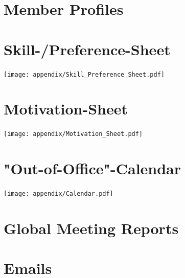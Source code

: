 \section{Member Profiles} 
\label{sec:member_profiles}








\section{Skill-/Preference-Sheet} \label{sec:Skill_Preference_Sheet}
\texttt{[image: appendix/Skill\_Preference\_Sheet.pdf]}

\section{Motivation-Sheet} 
\label{sec:Motivation_Sheet}
\texttt{[image: appendix/Motivation\_Sheet.pdf]}

\section{"Out-of-Office"-Calendar} 
\label{sec:Calendar}
\texttt{[image: appendix/Calendar.pdf]}

\section{Global Meeting Reports}








\section{Emails}

